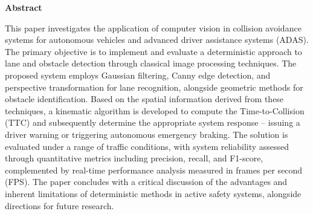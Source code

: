 \documentclass[12pt, a4paper]{report}
\renewcommand{\lstlistlistingname}{Popis isječaka koda}
\begin{document}
\newpage
\thispagestyle{empty}
{}
\null\vfill
\begin{center}
    {\Large\bfseries Abstract\par}
    \vspace{1cm}
    \begin{minipage}{0.9\textwidth}
        This paper investigates the application of computer vision in collision avoidance systems for autonomous vehicles and advanced driver assistance systems (ADAS). The primary objective is to implement and evaluate a deterministic approach to lane and obstacle detection through classical image processing techniques.
        The proposed system employs Gaussian filtering, Canny edge detection, and perspective transformation for lane recognition, alongside geometric methods for obstacle identification. Based on the spatial information derived from these techniques, a kinematic algorithm is developed to compute the Time-to-Collision (TTC) and subsequently determine the appropriate system response -- issuing a driver warning or triggering autonomous emergency braking.
        The solution is evaluated under a range of traffic conditions, with system reliability assessed through quantitative metrics including precision, recall, and F1-score, complemented by real-time performance analysis measured in frames per second (FPS).
        The paper concludes with a critical discussion of the advantages and inherent limitations of deterministic methods in active safety systems, alongside directions for future research.
    \end{minipage}
\end{center}
\vfill\null

\newpage
\tableofcontents

\listoffigures
{}

\listoftables
{}

\lstlistoflistings
\addcontentsline{toc}{chapter}{\lstlistlistingname}

\clearpage
{}
\setcounter{page}{1}









\printbibliography[heading=bibintoc, title={Literatura}]
\end{document}
